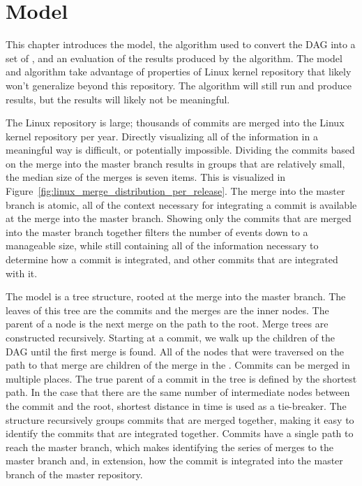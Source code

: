 \chapter{\mt{} Model}\label{chap:model}

This chapter introduces the \mt{} model, the algorithm used to
convert the DAG into a set of , and an evaluation of the results
produced by the algorithm.
The model and algorithm take advantage of properties of Linux kernel
repository that likely won't generalize beyond this repository.
The algorithm will still run and produce results, but the results will
likely not be meaningful.

The Linux repository is large;
thousands of commits are merged into the Linux kernel repository per
year.
Directly visualizing all of the information in a meaningful way is
difficult, or potentially impossible.
Dividing the commits based on the merge into the master branch results
in groups that are relatively small,
the median size of the merges is seven items.
This is visualized in
Figure~\ref{fig:linux_merge_distribution_per_release}.
The merge into the master branch is atomic, all of the context necessary
for integrating a commit is available at the merge into the master
branch.
Showing only the commits that are merged into the master
branch together filters the number of events down to a manageable size,
while still containing all of the information necessary to determine how
a commit is integrated, and other commits that are integrated with it.

The \mt{} model is a tree structure,
rooted at the merge into the master branch.
The leaves of this tree are the commits and the merges are the inner
nodes.
The parent of a node is the next merge on the path to the root.
Merge trees are constructed recursively.
Starting at a commit, we walk up the children of the DAG until the
first merge is found.
All of the nodes that were traversed on the path to that merge are
children of the merge in the \mt{}.
Commits can be merged in multiple places.
The true parent of a commit in the tree is defined by the shortest path.
In the case that there are the same number of intermediate nodes
between the commit and the root, shortest distance in time is used as a
tie-breaker.
The structure recursively groups commits that are merged together,
making it easy to identify the commits that are integrated together.
Commits have a single path to reach the master branch, which makes
identifying the series of merges to the master branch and, in extension,
how the commit is integrated into the master branch of the master
repository.

